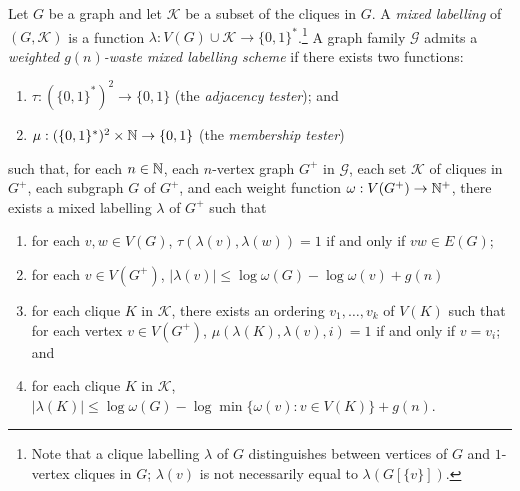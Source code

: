\documentclass{patmorin}
\renewcommand{\le}{\leqslant}
\newcommand{\david}[1]{{\color{orange} DW: #1}}
\newcommand{\defin}[1]{\emph{\textcolor{brightmaroon}{#1}}}
\begin{document}
  Let $G$ be a graph and let $\mathcal{K}$ be a subset of the cliques in $G$.
  A \defin{mixed labelling} of $(G,\mathcal{K})$ is a function $\lambda:V(G)\cup \mathcal{K}\to\{0,1\}^*$.\footnote{Note that a clique labelling $\lambda$ of $G$ distinguishes between vertices of $G$ and $1$-vertex cliques in $G$; $\lambda(v)$ is not necessarily equal to $\lambda(G[\{v\}])$.} A graph family $\mathcal{G}$ admits a \defin{weighted $g(n)$-waste mixed labelling scheme} if there exists two functions:
  \begin{enumerate}
      \item $\tau:(\{0,1\}^*)^2\to\{0,1\}$ (the \defin{adjacency tester}); and
      \item $\mu:(\{0,1\}^*)^2\times\mathbb{N}\to\{0,1\}$ (the \defin{membership tester})
  \end{enumerate}
  such that, for each $n\in\mathbb{N}$, each $n$-vertex graph $G^+$ in $\mathcal{G}$, each set $\mathcal{K}$ of cliques in $G^+$, each subgraph $G$ of $G^+$, and each weight function $\omega:V(G^+)\to\mathbb{N}^+$, there exists a mixed labelling $\lambda$ of $G^+$ such that
  \begin{enumerate}
    \item for each $v,w\in V(G)$, $\tau(\lambda(v),\lambda(w))=1$ if and only if $vw\in E(G)$;
    \item for each $v\in V(G^+)$, $|\lambda(v)|\le \log \omega(G) - \log\omega(v) + g(n)$
    \item for each clique $K$ in $\mathcal{K}$, there exists an ordering $v_1,\ldots,v_k$ of $V(K)$ such that for each vertex $v\in V(G^+)$, $\mu(\lambda(K),\lambda(v),i)=1$ if and only if $v=v_i$; and
    \item for each clique $K$ in $\mathcal{K}$, $|\lambda(K)|\le \log \omega(G) - \log\min\{\omega(v):v\in V(K)\} + g(n)$.
  \end{enumerate}


\end{document}
